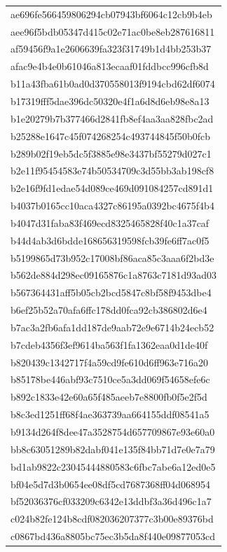 \begin{tabular}{l}
ae696fe566459806294cb07943bf6064c12cb9b4eb \\
aee96f5bdb05347d415c02e71ac0be8eb287616811 \\
af59456f9a1e2606639fa323f31749b1d4bb253b37 \\
afac9e4b4e0b61046a813ecaaf01fddbcc996cfb8d \\
b11a43fba61b0ad0d370558013f9194cbd62df6074 \\
b17319fff5dae396dc50320e4f1a6d8d6eb98e8a13 \\
b1e20279b7b377466d2841fb8ef4aa3aa828fbc2ad \\
b25288e1647c45f074268254c493744845f50b0fcb \\
b289b02f19eb5dc5f3885e98e3437bf55279d027c1 \\
b2e11f95454583e74b50534709c3d55bb3ab198cf8 \\
b2e16f9fd1edae54d089ce469d091084257cd891d1 \\
b4037b0165cc10aca4327c86195a0392bc4675f4b4 \\
b4047d31faba83f469ecd8325465828f40c1a37caf \\
b44d4ab3d6bdde168656319598fcb39fe6ff7ac0f5 \\
b5199865d73b952c17008bf86aca85c3aaa6f2bd3e \\
b562de884d298ec09165876c1a8763c7181d93ad03 \\
b567364431aff5b05cb2bcd5847c8bf58f9453dbe4 \\
b6ef25b52a70afa6ffc178dd0fca92cb386802d6e4 \\
b7ac3a2fb6afa1dd187de9aab72e9e6714b24ecb52 \\
b7cdeb4356f3ef9614ba563f1fa1362eaa0d1de40f \\
b820439c1342717f4a59cd9fe610d6ff963e716a20 \\
b85178be446abf93c7510ce5a3dd069f54658efe6c \\
b892c1833e42e60a65f485aeeb7e8800fb0f5e2f5d \\
b8c3ed1251ff68f4ae363739aa664155ddf08541a5 \\
b9134d264f8dee47a3528754d657709867e93e60a0 \\
bb8c63051289b82dabf041e135f84bb71d7e0e7a79 \\
bd1ab9822c23045444880583c6fbc7abe6a12ed0e5 \\
bf04e5d7d3b0654ee08df5cd7687368ff04d068954 \\
bf52036376cf033209c6342e13ddbf3a36d496c1a7 \\
c024b82fe124b8cdf082036207377c3b00e89376bd \\
c0867bd436a8805bc75ec3b5da8f440e09877053cd \\

\end{tabular}
